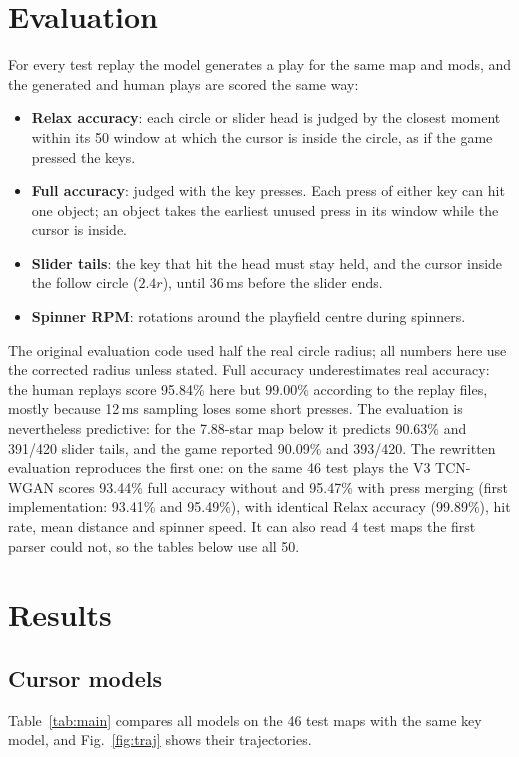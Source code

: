 \documentclass[11pt,a4paper]{article}
\begin{document}
\section{Evaluation}
For every test replay the model generates a play for the same map and mods, and the generated and human plays
are scored the same way:
\begin{itemize}
  \item \textbf{Relax accuracy}: each circle or slider head is judged by the closest moment within its 50
        window at which the cursor is inside the circle, as if the game pressed the keys.
  \item \textbf{Full accuracy}: judged with the key presses. Each press of either key can hit one object; an
        object takes the earliest unused press in its window while the cursor is inside.
  \item \textbf{Slider tails}: the key that hit the head must stay held, and the cursor inside the follow
        circle ($2.4r$), until 36\,ms before the slider ends.
  \item \textbf{Spinner RPM}: rotations around the playfield centre during spinners.
\end{itemize}
The original evaluation code used half the real circle radius; all numbers here use the corrected radius
unless stated. Full accuracy underestimates real accuracy: the human replays score 95.84\% here but 99.00\%
according to the replay files, mostly because 12\,ms sampling loses some short presses. The evaluation is
nevertheless predictive: for the 7.88-star map below it predicts 90.63\% and 391/420 slider tails, and the
game reported 90.09\% and 393/420. The rewritten evaluation reproduces the first one: on the same 46 test
plays the V3 TCN-WGAN scores 93.44\% full accuracy without and 95.47\% with press merging (first
implementation: 93.41\% and 95.49\%), with identical Relax accuracy (99.89\%), hit rate, mean distance and
spinner speed. It can also read 4 test maps the first parser could not, so the tables below use all 50.

\section{Results}
\subsection{Cursor models}
Table~\ref{tab:main} compares all models on the 46 test maps with the same key model, and
Fig.~\ref{fig:traj} shows their trajectories.
\end{document}
